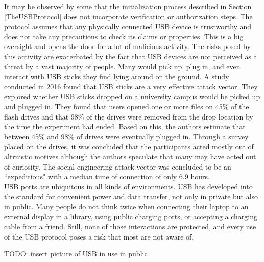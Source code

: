 It may be observed by some that the initialization process described in Section \ref{TheUSBProtocol} does not incorporate verification or authorization steps. The protocol assumes that any physically connected USB device is trustworthy and does not take any precautions to check its claims or properties. This is a big oversight and opens the door for a lot of malicious activity. 
The risks posed by this activity are exacerbated by the fact that USB devices are not perceived as a threat by a vast majority of people. Many would pick up, plug in, and even interact with USB sticks they find lying around on the ground. A study \cite{tischerUsersReallyPlug2016} conducted in 2016 found that USB sticks are a very effective attack vector. They explored whether USB sticks dropped on a university campus would be picked up and plugged in. They found that users opened one or more files on 45\% of the flash drives and that 98\% of the drives were removed from the drop location by the time the experiment had ended. Based on this, the authors estimate that between 45\% and 98\% of drives were eventually plugged in. Through a survey placed on the drives, it was concluded that the participants acted mostly out of altruistic motives although the authors speculate that many may have acted out of curiosity. The social engineering attack vector was concluded to be an ``expeditious" with a median time of connection of only 6.9 hours. \\
USB ports are ubiquitous in all kinds of environments. USB has developed into the standard for convenient power and data transfer, not only in private but also in public.  Many people do not think twice when connecting their laptop to an external display in a library, using public charging ports, or accepting a charging cable from a friend. Still, none of those interactions are protected, and every use of the USB protocol poses a risk that most are not aware of.

TODO: insert picture of USB in use in public

